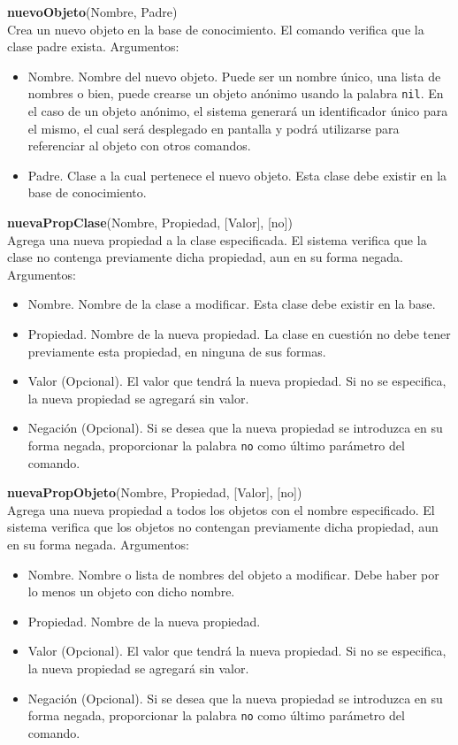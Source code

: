 \documentclass[11pt]{article}
\newcommand{\comando}[2]{
    \textbf{#1}(#2)\\
}
\newenvironment{args}{
    \newline
    Argumentos:
    \begin{itemize}
}{
    \end{itemize}
    \bigskip
}
\begin{document}
\comando{nuevoObjeto}{Nombre, Padre}
Crea un nuevo objeto en la base de conocimiento. El comando verifica que la clase padre exista.
\begin{args}
    \item Nombre. Nombre del nuevo objeto. Puede ser un nombre único, una lista de nombres o bien, puede crearse un objeto anónimo usando la palabra \texttt{nil}. En el caso de un objeto anónimo, el sistema generará un identificador único para el mismo, el cual será desplegado en pantalla y podrá utilizarse para referenciar al objeto con otros comandos.
    \item Padre. Clase a la cual pertenece el nuevo objeto. Esta clase debe existir en la base de conocimiento.
\end{args}

\comando{nuevaPropClase}{Nombre, Propiedad, [Valor], [no]}
Agrega una nueva propiedad a la clase especificada. El sistema verifica que la clase no contenga previamente dicha propiedad, aun en su forma negada.
\begin{args}
    \item Nombre. Nombre de la clase a modificar. Esta clase debe existir en la base.
    \item Propiedad. Nombre de la nueva propiedad. La clase en cuestión no debe tener previamente esta propiedad, en ninguna de sus formas.
    \item Valor (Opcional). El valor que tendrá la nueva propiedad. Si no se especifica, la nueva propiedad se agregará sin valor.
    \item Negación (Opcional). Si se desea que la nueva propiedad se introduzca en su forma negada, proporcionar la palabra \texttt{no} como último parámetro del comando.
\end{args}

\comando{nuevaPropObjeto}{Nombre, Propiedad, [Valor], [no]}
Agrega una nueva propiedad a todos los objetos con el nombre especificado. El sistema verifica que los objetos no contengan previamente dicha propiedad, aun en su forma negada.
\begin{args}
    \item Nombre. Nombre o lista de nombres del objeto a modificar. Debe haber por lo menos un objeto con dicho nombre.
    \item Propiedad. Nombre de la nueva propiedad.
    \item Valor (Opcional). El valor que tendrá la nueva propiedad. Si no se especifica, la nueva propiedad se agregará sin valor.
    \item Negación (Opcional). Si se desea que la nueva propiedad se introduzca en su forma negada, proporcionar la palabra \texttt{no} como último parámetro del comando.
\end{args}
\end{document}
